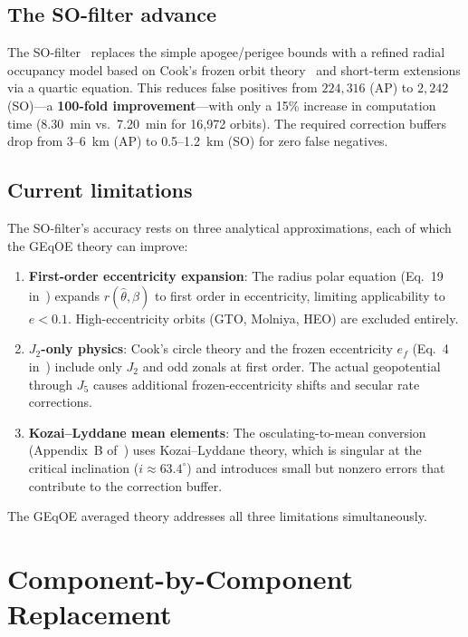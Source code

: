 \documentclass[11pt]{article}
\begin{document}
\subsection{The SO-filter advance}

The SO-filter~\cite{rivero2025} replaces the simple apogee/perigee bounds
with a refined radial occupancy model based on Cook's frozen orbit
theory~\cite{cook1966} and short-term extensions via a quartic equation. This
reduces false positives from $224{,}316$ (AP) to $2{,}242$ (SO)---a
\textbf{100-fold improvement}---with only a 15\% increase in computation time
(8.30~min vs.\ 7.20~min for 16,972 orbits). The required correction buffers
drop from 3--6~km (AP) to 0.5--1.2~km (SO) for zero false negatives.

\subsection{Current limitations}

The SO-filter's accuracy rests on three analytical approximations, each of
which the GEqOE theory can improve:
\begin{enumerate}
\item \textbf{First-order eccentricity expansion}: The radius polar equation
(Eq.~19 in~\cite{rivero2025}) expands $r(\hat\theta, \beta)$ to first order
in eccentricity, limiting applicability to $e < 0.1$. High-eccentricity
orbits (GTO, Molniya, HEO) are excluded entirely.
\item \textbf{$J_2$-only physics}: Cook's circle theory and the frozen
eccentricity $e_f$ (Eq.~4 in~\cite{rivero2025}) include only $J_2$ and odd
zonals at first order. The actual geopotential through $J_5$ causes additional
frozen-eccentricity shifts and secular rate corrections.
\item \textbf{Kozai--Lyddane mean elements}: The osculating-to-mean
conversion (Appendix~B of~\cite{rivero2025}) uses Kozai--Lyddane theory, which
is singular at the critical inclination ($i \approx 63.4^\circ$) and
introduces small but nonzero errors that contribute to the correction buffer.
\end{enumerate}

The GEqOE averaged theory addresses all three limitations simultaneously.

\section{Component-by-Component Replacement}
\label{sec:components}
\end{document}
